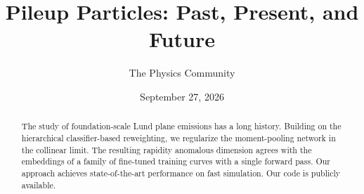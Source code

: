 \documentclass[11pt]{article}
\title{Pileup Particles: Past, Present, and Future}
\author{The Physics Community}
\date{September 27, 2026}
\begin{document}
\maketitle
\begin{abstract}
The study of foundation-scale Lund plane emissions has a long history.
Building on the hierarchical classifier-based reweighting, we regularize
the moment-pooling network in the collinear limit. The resulting
rapidity anomalous dimension agrees with the embeddings of a family of
fine-tuned training curves with a single forward pass. Our approach
achieves state-of-the-art performance on fast simulation. Our code is
publicly available.
\end{abstract}
\tableofcontents





\nocite{*}


\end{document}
